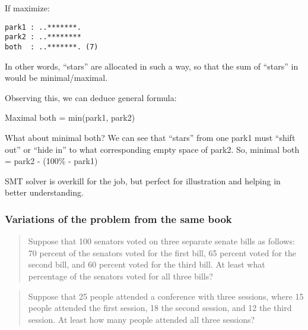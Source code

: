 If maximize:

\begin{lstlisting}
park1 : ..*******.
park2 : ..********
both  : ..*******. (7)
\end{lstlisting}

In other words, ``stars'' are allocated in such a way, so that the sum of ``stars'' in  would be minimal/maximal.

Observing this, we can deduce general formula:

Maximal both = min(park1, park2)

What about minimal both?
We can see that ``stars'' from one park1 must ``shift out'' or ``hide in'' to what corresponding empty space of park2.
So, minimal both = park2 - (100\% - park1)

SMT solver is overkill for the job, but perfect for illustration and helping in better understanding.

\subsubsection{Variations of the problem from the same book}

\begin{framed}
\begin{quotation}

Suppose that 100 senators voted on three separate senate bills as follows:
70 percent of the senators voted for the first bill, 65 percent voted for the second bill,
and 60 percent voted for the third bill. At least what percentage of the senators voted for all three bills?

\end{quotation}
\end{framed}

\begin{framed}
\begin{quotation}

Suppose that 25 people attended a conference with three sessions, where 15 people attended the first session, 
18 the second session, and 12 the third session. At least how many people attended all three sessions?

\end{quotation}
\end{framed}


